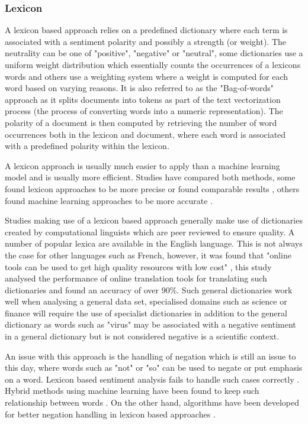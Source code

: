 \subsubsection{Lexicon}

A lexicon based approach relies on a predefined dictionary where each term is associated with a sentiment polarity and possibly a strength (or weight). The neutrality can be one of "positive", "negative" or "neutral", some dictionaries use a uniform weight distribution which essentially counts the occurrences of a lexicons words and others use a weighting system where a weight is computed for each word based on varying reasons. It is also referred to as the "Bag-of-words" approach as it splits documents into tokens as part of the text vectorization process (the process of converting words into a numeric representation). The polarity of a document is then computed by retrieving the number of word occurrences both in the lexicon and document, where each word is associated with a predefined polarity within the lexicon.

A lexicon approach is usually much easier to apply than a machine learning model and is usually more efficient. Studies have compared both methods, some found lexicon approaches to be more precise or found comparable results \citep{dhaoui2017social,mukhtar2018lexicon}, others found machine learning approaches to be more accurate \citep{kolchyna2015twitter,nasim2017sentiment}.

Studies making use of a lexicon based approach generally make use of dictionaries created by computational linguists which are peer reviewed to ensure quality. A number of popular lexica are available in the English language. This is not always the case for other languages such as French, however, it was found that "online tools can be used to get high quality resources with low cost" \citep{abdaoui2017feel}, this study analysed the performance of online translation tools for translating such dictionaries and found an accuracy of over 90\%. Such general dictionaries work well when analysing a general data set, specialised domains such as science or finance will require the use of specialist dictionaries in addition to the general dictionary as words such as "virus" may be associated with a negative sentiment in a general dictionary but is not considered negative is a scientific context.

An issue with this approach is the handling of negation which is still an issue to this day, where words such as "not" or "so" can be used to negate or put emphasis on a word. Lexicon based sentiment analysis fails to handle such cases correctly \citep{le2014distributed}. Hybrid methods using machine learning have been found to keep such relationship between words \citep{mikolov2013exploiting}. On the other hand, algorithms have been developed for better negation handling in lexicon based approaches \citep{diamantini2016negation}.


